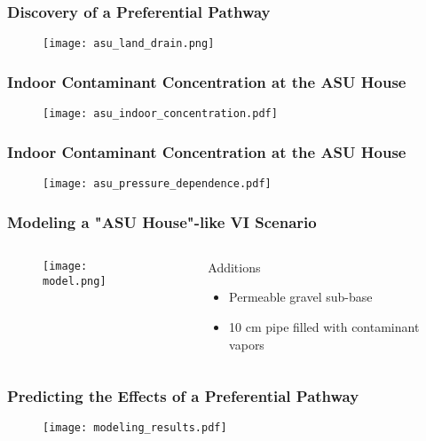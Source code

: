 \begin{frame}
  \frametitle{Discovery of a Preferential Pathway}
    \begin{figure}
      \texttt{[image: asu\_land\_drain.png]}
      \caption{\tiny{\citeauthor{guo_identification_2015}\cite{guo_identification_2015}}}
    \end{figure}
\end{frame}

\begin{frame}
  \frametitle{Indoor Contaminant Concentration at the ASU House}
    \begin{figure}
      \centering
      \texttt{[image: asu\_indoor\_concentration.pdf]}
    \end{figure}
\end{frame}

\begin{frame}
  \frametitle{Indoor Contaminant Concentration at the ASU House}
    \begin{figure}
      \centering
      \texttt{[image: asu\_pressure\_dependence.pdf]}
    \end{figure}
\end{frame}

\begin{frame}
  \frametitle{Modeling a "ASU House"-like VI Scenario}
  \begin{columns}[T]
    \begin{column}{0.6\textwidth}
      \begin{figure}
        \centering
        \texttt{[image: model.png]}
      \end{figure}
    \end{column}
    \begin{column}{0.4\textwidth}
      \begin{block}{Additions}
        \begin{itemize}
          \item Permeable gravel sub-base
          \item 10 cm pipe filled with contaminant vapors
        \end{itemize}
      \end{block}
    \end{column}
  \end{columns}
\end{frame}

\begin{frame}
  \frametitle{Predicting the Effects of a Preferential Pathway}
  \begin{figure}
    \centering
    \texttt{[image: modeling\_results.pdf]}
  \end{figure}
\end{frame}

